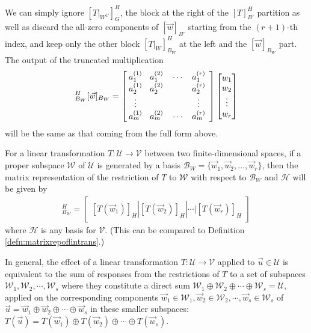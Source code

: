 We can simply ignore $[T|_{W^C}]_G^H$, the block at the right of the $[T]_{B'}^H$ partition as well as discard the all-zero components of $[\vec{w}]_{B'}$ starting from the $(r+1)$-th index, and keep only the other block $[T|_{W}]_{B_W}^H$ at the left and the $[\vec{w}]_{B_W}$ part. The output of the truncated multiplication
\begin{align*}
[T|_{W}]_{B_W}^H [\vec{w}]_{B_W} = 
\left[\begin{array}{@{\;}wc{15pt}wc{15pt}wc{15pt}wc{15pt}}
a_1^{(1)} & a_1^{(2)} & \cdots & a_1^{(r)} \\
a_2^{(1)} & a_2^{(2)} & & a_2^{(r)} \\
\vdots & & & \vdots \\
a_m^{(1)} & a_m^{(2)} & \cdots & a_m^{(r)} 
\end{array}\right]
\begin{bmatrix}
w_1 \\
w_2 \\
\vdots \\
w_r \\
\end{bmatrix}
\end{align*}
will be the same as that coming from the full form above.
\begin{proper}
\label{proper:restrictmat}
For a linear transformation $T: \mathcal{U} \to \mathcal{V}$ between two finite-dimensional spaces, if a proper subspace $\mathcal{W}$ of $\mathcal{U}$ is generated by a basis $\mathcal{B}_W = \{\vec{w}_1, \vec{w}_2, \ldots, \vec{w}_r\}$, then the matrix representation of the restriction of $T$ to $\mathcal{W}$ with respect to $\mathcal{B}_W$ and $\mathcal{H}$ will be given by
\begin{align*}
[T|_{W}]_{B_W}^H = \begin{bmatrix}
[T(\vec{w}_1)]_H | [T(\vec{w}_2)]_H | \cdots | [T(\vec{w}_r)]_H
\end{bmatrix}    
\end{align*}
where $\mathcal{H}$ is any basis for $\mathcal{V}$. (This can be compared to Definition \ref{defn:matrixrepoflintrans}.)
\end{proper}
In general, the effect of a linear transformation $T: \mathcal{U} \to \mathcal{V}$ applied to $\vec{u} \in \mathcal{U}$ is equivalent to the sum of responses from the restrictions of $T$ to a set of subspaces $\mathcal{W}_1, \mathcal{W}_2, \cdots, \mathcal{W}_s$ where they constitute a direct sum $\mathcal{W}_1 \oplus \mathcal{W}_2 \oplus \cdots \oplus \mathcal{W}_s = \mathcal{U}$, applied on the corresponding components $\vec{w}_1 \in \mathcal{W}_1, \vec{w}_2 \in \mathcal{W}_2, \cdots, \vec{w}_s \in \mathcal{W}_s$ of $\vec{u} = \vec{w}_1 \oplus \vec{w}_2 \oplus \cdots \oplus \vec{w}_s$ in these smaller subspaces: $T(\vec{u}) = T(\vec{w}_1) \oplus T(\vec{w}_2) \oplus \cdots \oplus T(\vec{w}_s)$.
